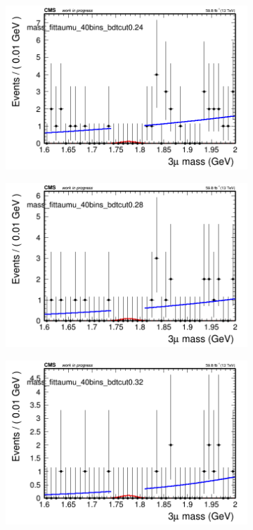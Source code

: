 \begin{figure}[H]
\begin{subfigure}{0.2\textwidth}
        \includegraphics[width=\textwidth]{power_law/plots/taumu/massfit_taumu_40bins_bdtcut0.24.png}
        \caption{}
    \end{subfigure}
    \begin{subfigure}{0.2\textwidth}
        \includegraphics[width=\textwidth]{power_law/plots/taumu/massfit_taumu_40bins_bdtcut0.28.png}
        \caption{}
    \end{subfigure}
    \begin{subfigure}{0.2\textwidth}
        \includegraphics[width=\textwidth]{power_law/plots/taumu/massfit_taumu_40bins_bdtcut0.32.png}

\end{subfigure}
\end{figure}
